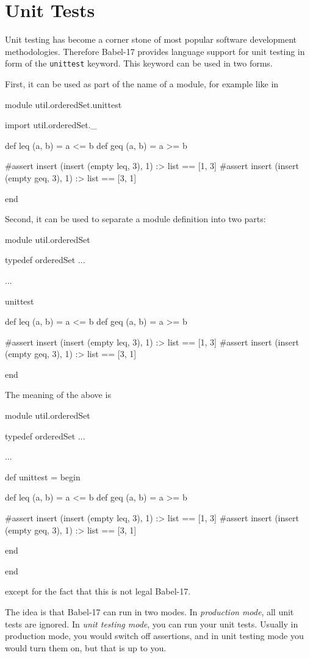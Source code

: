 \documentclass[11pt]{amsart}
\newcommand{\babelsrc}[1] {\lstinline!#1!}
\begin{document}
\section{Unit Tests}
Unit testing has become a corner stone of most popular software development methodologies. Therefore Babel-17 provides language support for unit testing in form of the \babelsrc{unittest} keyword. This keyword can be used in two forms. 

First, it can be used as part of the name of a module, for example like in
\begin{babellisting}
module util.orderedSet.unittest

import util.orderedSet._

def leq (a, b) = a <= b
def geq (a, b) = a >= b

#assert insert (insert (empty leq, 3), 1) :> list == [1, 3]
#assert insert (insert (empty geq, 3), 1) :> list == [3, 1]

end
\end{babellisting}
Second, it can be used to separate a module definition into two parts:
\begin{babellisting}
module util.orderedSet

typedef orderedSet ...

...

unittest

def leq (a, b) = a <= b
def geq (a, b) = a >= b

#assert insert (insert (empty leq, 3), 1) :> list == [1, 3]
#assert insert (insert (empty geq, 3), 1) :> list == [3, 1]

end
\end{babellisting}
The meaning of the above is
\begin{babellisting}
module util.orderedSet

typedef orderedSet ...

...

def unittest = 
  begin

    def leq (a, b) = a <= b 
    def geq (a, b) = a >= b

    #assert insert (insert (empty leq, 3), 1) :> list == [1, 3]
    #assert insert (insert (empty geq, 3), 1) :> list == [3, 1]

  end

end
\end{babellisting}
except for the fact that this is not legal Babel-17.

The idea is that Babel-17 can run in two modes. In \emph{production mode}, all unit tests are ignored. In \emph{unit testing mode}, you can run your unit tests. Usually in production mode, you would switch off assertions, and in unit testing mode you would turn them on, but that is up to you.
\end{document}
